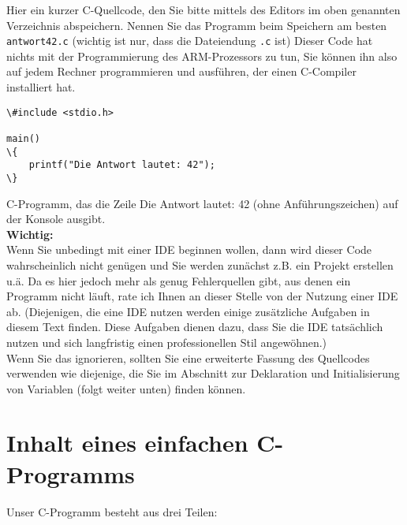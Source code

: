 Hier ein kurzer C-Quellcode, den Sie bitte mittels des Editors im oben genannten Verzeichnis abspeichern. Nennen Sie das Programm beim Speichern am besten \verb|antwort42.c| (wichtig ist nur, dass die Dateiendung \verb|.c| ist) Dieser Code hat nichts mit der Programmierung des ARM-Prozessors zu tun, Sie können ihn also auf jedem Rechner programmieren und ausführen, der einen C-Compiler installiert hat.\\

\begin{verbatim}
\#include <stdio.h>

main() 
\{
	printf("Die Antwort lautet: 42");
\}
\end{verbatim}

C-Programm, das die Zeile \glqq{}Die Antwort lautet: 42\grqq{} (ohne Anführungszeichen) auf der Konsole ausgibt.\\

\textbf{Wichtig:}\\

Wenn Sie unbedingt mit einer IDE beginnen wollen, dann wird dieser Code wahrscheinlich nicht genügen und Sie werden zunächst z.B. ein Projekt erstellen u.ä. Da es hier jedoch mehr als genug Fehlerquellen gibt, aus denen ein Programm nicht läuft, rate ich Ihnen an dieser Stelle von der Nutzung einer IDE ab. (Diejenigen, die eine IDE nutzen werden einige zusätzliche Aufgaben in diesem Text finden. Diese Aufgaben dienen dazu, dass Sie die IDE tatsächlich nutzen und sich langfristig einen professionellen Stil angewöhnen.)\\

Wenn Sie das ignorieren, sollten Sie eine erweiterte Fassung des Quellcodes verwenden wie diejenige, die Sie im Abschnitt zur Deklaration und Initialisierung von Variablen (folgt weiter unten) finden können.

\section{Inhalt eines einfachen C-Programms}

Unser C-Programm besteht aus drei Teilen:


